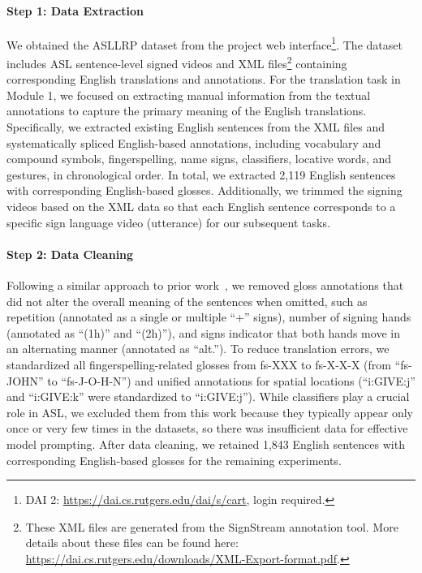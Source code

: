 \paragraph{Step 1: Data Extraction} We obtained the ASLLRP dataset from the project web interface\footnote{DAI 2: \url{https://dai.cs.rutgers.edu/dai/s/cart}, login required.}. The dataset includes ASL sentence-level signed videos and XML files\footnote{These XML files are generated from the SignStream annotation tool. More details about these files can be found here: \url{https://dai.cs.rutgers.edu/downloads/XML-Export-format.pdf}.} containing corresponding English translations and annotations. For the translation task in Module 1, we focused on extracting manual information from the textual annotations to capture the primary meaning of the English translations. Specifically, we extracted existing English sentences from the XML files and systematically spliced English-based annotations, including vocabulary and compound symbols, fingerspelling, name signs, classifiers, locative words, and gestures, in chronological order. In total, we extracted 2,119 English sentences with corresponding English-based glosses. Additionally, we trimmed the signing videos based on the XML data so that each English sentence corresponds to a specific sign language video (utterance) for our subsequent tasks.

\paragraph{Step 2: Data Cleaning} Following a similar approach to prior work~\cite{amin_sign_2021}, we removed gloss annotations that did not alter the overall meaning of the sentences when omitted, such as repetition (annotated as a single or multiple ``+'' signs), number of signing hands (annotated as ``(1h)'' and ``(2h)''), and signs indicator that both hands move in an alternating manner (annotated as ``alt.''). To reduce translation errors, we standardized all fingerspelling-related glosses from fs-XXX to fs-X-X-X (\eg from ``fs-JOHN'' to ``fs-J-O-H-N'') and unified annotations for spatial locations (\eg ``i:GIVE:j'' and ``i:GIVE:k'' were standardized to ``i:GIVE:j''). While classifiers play a crucial role in ASL, we excluded them from this work because they typically appear only once or very few times in the datasets, so there was insufficient data for effective model prompting. After data cleaning, we retained 1,843 English sentences with corresponding English-based glosses for the remaining experiments. 

